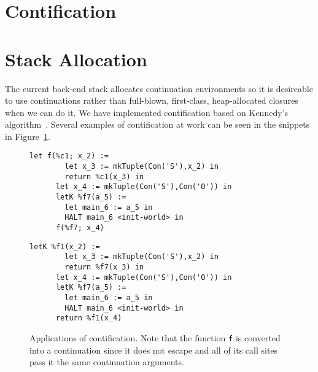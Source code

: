 \documentclass{article}
\begin{document}
\section{Contification}
\label{sec:contification}

\section{Stack Allocation}
\label{sec:stack-alloc}


The current back-end stack allocates continuation environments so it is desireable to use continuations rather than full-blown, first-class, heap-allocated closures when we can do it. We have implemented contification based on Kennedy's algorithm~\cite{kennedy07cps}. Several examples of contification at work can be seen in the snippets in Figure~\ref{fig:contification}.
\begin{figure}

   \begin{lstlisting}[gobble=6,caption={Before contification}]
      let f(%c1; x_2) := 
        let x_3 := mkTuple(Con('S'),x_2) in
        return %c1(x_3) in
      let x_4 := mkTuple(Con('S'),Con('O')) in
      letK %f7(a_5) := 
        let main_6 := a_5 in
        HALT main_6 <init-world> in
      f(%f7; x_4)
    \end{lstlisting}
    \begin{lstlisting}[gobble=6,caption={After contification}]
      letK %f1(x_2) := 
        let x_3 := mkTuple(Con('S'),x_2) in
        return %f7(x_3) in
      let x_4 := mkTuple(Con('S'),Con('O')) in
      letK %f7(a_5) := 
        let main_6 := a_5 in
        HALT main_6 <init-world> in
      return %f1(x_4)
    \end{lstlisting}

\caption{Applications of contification. Note that the function \lstinline!f! is converted into a continuation since it does not escape and all of its call sites pass it the same continuation arguments.}
\label{fig:contification}
\end{figure}
\end{document}
